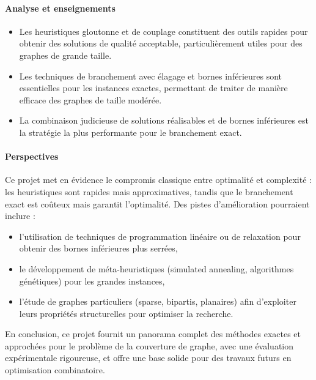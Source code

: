 \documentclass[11pt,a4paper]{article}
\begin{document}
\paragraph{Analyse et enseignements}
\begin{itemize}
    \item Les heuristiques gloutonne et de couplage constituent des outils rapides pour obtenir des solutions de qualité acceptable, particulièrement utiles pour des graphes de grande taille.
    \item Les techniques de branchement avec élagage et bornes inférieures sont essentielles pour les instances exactes, permettant de traiter de manière efficace des graphes de taille modérée.
    \item La combinaison judicieuse de solutions réalisables et de bornes inférieures est la stratégie la plus performante pour le branchement exact.
\end{itemize}

\paragraph{Perspectives}
Ce projet met en évidence le compromis classique entre optimalité et complexité : les heuristiques sont rapides mais approximatives, tandis que le branchement exact est coûteux mais garantit l’optimalité. Des pistes d’amélioration pourraient inclure :
\begin{itemize}
    \item l’utilisation de techniques de programmation linéaire ou de relaxation pour obtenir des bornes inférieures plus serrées,
    \item le développement de méta-heuristiques (simulated annealing, algorithmes génétiques) pour les grandes instances,
    \item l’étude de graphes particuliers (sparse, bipartis, planaires) afin d’exploiter leurs propriétés structurelles pour optimiser la recherche.
\end{itemize}

En conclusion, ce projet fournit un panorama complet des méthodes exactes et approchées pour le problème de la couverture de graphe, avec une évaluation expérimentale rigoureuse, et offre une base solide pour des travaux futurs en optimisation combinatoire.
\end{document}

